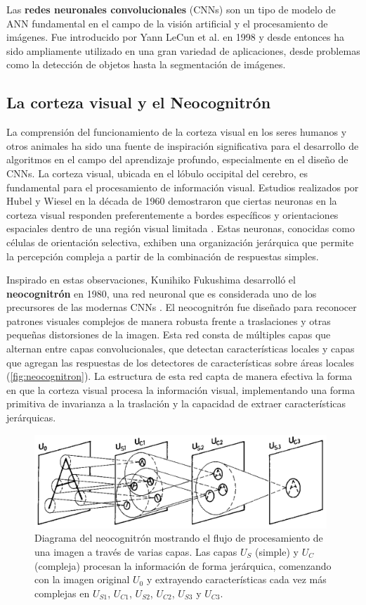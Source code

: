 Las \textbf{redes neuronales convolucionales} (CNNs) son un tipo de modelo de ANN fundamental en el campo de la visión artificial y el procesamiento de imágenes. Fue introducido por Yann LeCun et al. en 1998 y desde entonces ha sido ampliamente utilizado en una gran variedad de aplicaciones, desde problemas como la detección de objetos hasta la segmentación de imágenes.

\subsection{La corteza visual y el Neocognitrón}

La comprensión del funcionamiento de la corteza visual en los seres humanos y otros animales ha sido una fuente de inspiración significativa para el desarrollo de algoritmos en el campo del aprendizaje profundo, especialmente en el diseño de CNNs. La corteza visual, ubicada en el lóbulo occipital del cerebro, es fundamental para el procesamiento de información visual. Estudios realizados por Hubel y Wiesel en la década de 1960 demostraron que ciertas neuronas en la corteza visual responden preferentemente a bordes específicos y orientaciones espaciales dentro de una región visual limitada \cite{hubel1962receptive}. Estas neuronas, conocidas como células de orientación selectiva, exhiben una organización jerárquica que permite la percepción compleja a partir de la combinación de respuestas simples.

Inspirado en estas observaciones, Kunihiko Fukushima desarrolló el \textbf{neocognitrón} en 1980, una red neuronal que es considerada uno de los precursores de las modernas CNNs \cite{fukushima1980neocognitron}. El neocognitrón fue diseñado para reconocer patrones visuales complejos de manera robusta frente a traslaciones y otras pequeñas distorsiones de la imagen. Esta red consta de múltiples capas que alternan entre capas convolucionales, que detectan características locales y capas que agregan las respuestas de los detectores de características sobre áreas locales (\autoref{fig:neocognitron}). La estructura de esta red capta de manera efectiva la forma en que la corteza visual procesa la información visual, implementando una forma primitiva de invarianza a la traslación y la capacidad de extraer características jerárquicas.

\begin{figure}[h]
	\centering
	\includegraphics[width=110mm]{img/neocognitron.png}
	\caption{Diagrama del neocognitrón mostrando el flujo de procesamiento de una imagen a través de varias capas. Las capas \(U_{S}\) (simple) y \(U_{C}\) (compleja) procesan la información de forma jerárquica, comenzando con la imagen original \(U_0\) y extrayendo características cada vez más complejas en \(U_{S1}\), \(U_{C1}\), \(U_{S2}\), \(U_{C2}\), \(U_{S3}\) y \(U_{C3}\).}
	\label{fig:neocognitron}
\end{figure}

